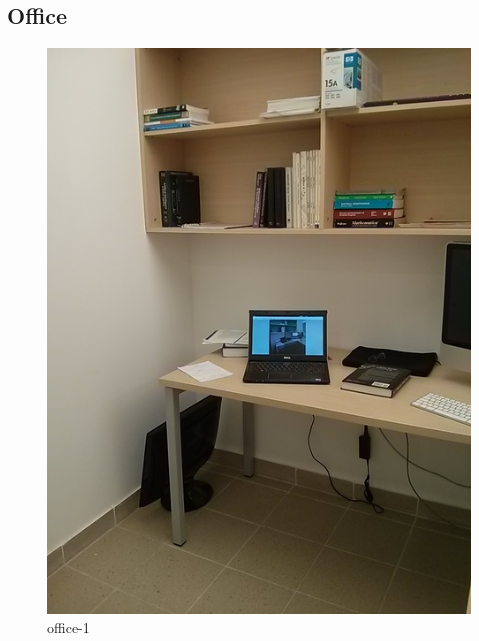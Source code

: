 \documentclass[12pt,a4paper]{report}
\begin{document}
\subsection*{Office}
\begin{figure}[!htb]
  \includegraphics[width=\linewidth]{office1}
    \caption{office-1}
\endminipage\hfill
{}

\end{figure}
\end{document}
